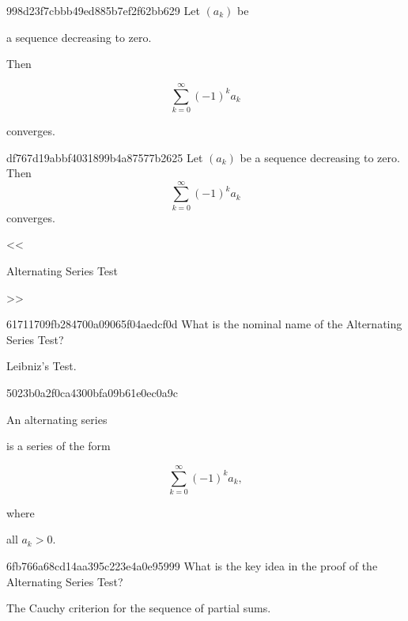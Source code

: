 \begin{note}{998d23f7cbbb49ed885b7ef2f62bb629}
    Let \({ (a_k) }\) be \begin{icloze}{3}a sequence decreasing to zero.\end{icloze}
    Then
    \begin{icloze}{2}
        \[
            \sum_{k=0}^{\infty} (-1)^{k}a_k
        \]
    \end{icloze}
    \begin{icloze}{1}converges.\end{icloze}
\end{note}

\begin{note}{df767d19abbf4031899b4a87577b2625}
    Let \({ (a_k) }\) be a sequence decreasing to zero.
    Then
    \[
        \sum_{k=0}^{\infty} (-1)^{k}a_k
    \]
    converges.

    \begin{center}
        \tiny
        <<\begin{icloze}{1}Alternating Series Test\end{icloze}>>
    \end{center}
\end{note}

\begin{note}{61711709fb284700a09065f04aedcf0d}
    What is the nominal name of the Alternating Series Test?

    \begin{cloze}{1}
        Leibniz's Test.
    \end{cloze}
\end{note}

\begin{note}{5023b0a2f0ca4300bfa09b61e0ec0a9c}
    \begin{icloze}{1}An alternating series\end{icloze} is a series of the form
    \begin{icloze}{2}
        \[
            \sum_{k=0}^{\infty} (-1)^{k}a_k,
        \]
    \end{icloze}
    where \begin{icloze}{3}all \({ a_k > 0 }\).\end{icloze}
\end{note}

\begin{note}{6fb766a68cd14aa395c223e4a0e95999}
    What is the key idea in the proof of the Alternating Series Test?

    \begin{cloze}{1}
        The Cauchy criterion for the sequence of partial sums.
    \end{cloze}
\end{note}


